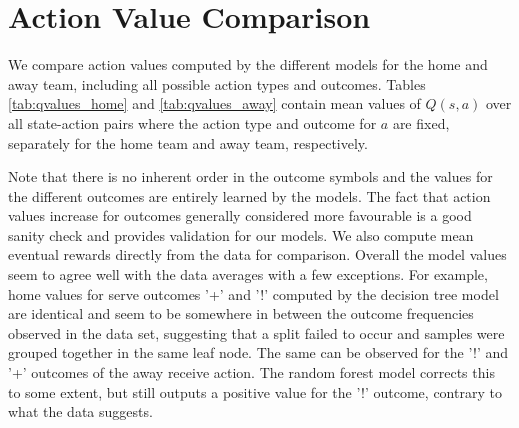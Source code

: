 \documentclass{sfuthesis}
\begin{document}
	\section{Action Value Comparison}
	
	We compare action values computed by the different models for the home and away team, including all possible action types and outcomes. Tables \ref{tab:qvalues_home} and \ref{tab:qvalues_away} contain mean values of $Q(s,a)$ over all state-action pairs where the action type and outcome for $a$ are fixed, separately for the home team and away team, respectively.
	
	Note that there is no inherent order in the outcome symbols and the values for the different outcomes are entirely learned by the models. The fact that action values increase for outcomes generally considered more favourable is a good sanity check and provides validation for our models. We also compute mean eventual rewards directly from the data for comparison. Overall the model values seem to agree well with the data averages with a few exceptions. For example, home values for serve outcomes '+' and '!' computed by the decision tree model are identical and seem to be somewhere in between the outcome frequencies observed in the data set, suggesting that a split failed to occur and samples were grouped together in the same leaf node. The same can be observed for the '!' and '+' outcomes of the away receive action. The random forest model corrects this to some extent, but still outputs a positive value for the '!' outcome, contrary to what the data suggests.
	
\end{document}
